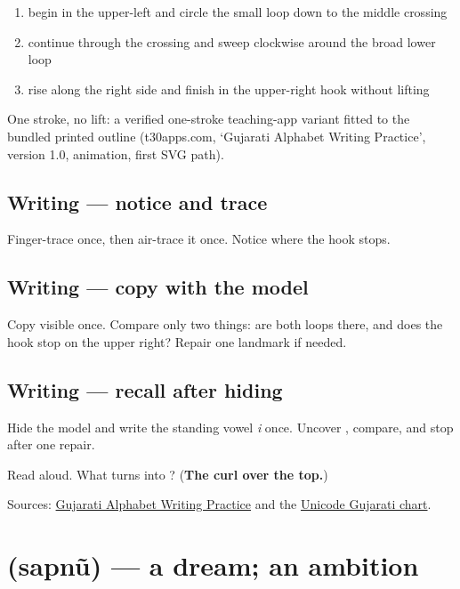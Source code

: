 \begin{enumerate}
\raggedright
  \item begin in the upper-left and circle the small loop down to the middle crossing
  \item continue through the crossing and sweep clockwise around the broad lower loop
  \item rise along the right side and finish in the upper-right hook without lifting
\end{enumerate}

One stroke, no lift: a verified one-stroke teaching-app variant fitted to the bundled printed outline (t30apps.com, ‘Gujarati Alphabet Writing Practice’, version 1.0,  animation, first SVG path).

\subsection*{Writing — notice and trace}

Finger-trace \textbf{} once, then air-trace it once. Notice where the hook stops.

\subsection*{Writing — copy with the model}
Copy visible \textbf{} once. Compare only two things: are both loops there, and does the hook stop on the upper right? Repair one landmark if needed.

\subsection*{Writing — recall after hiding}
Hide the model and write the standing vowel \emph{i} once. Uncover \textbf{}, compare, and stop after one repair.

\begin{tcolorbox}[breakable,colback=teal!4,colframe=teal!35!black,title={Before you move on}]
Read \textbf{  } aloud. What turns \textbf{} into \textbf{}? (\textbf{The curl over the top.})

Sources: \href{https://www.t30apps.com/gujarati-alphabet-writing/}{Gujarati Alphabet Writing Practice} and the \href{https://www.unicode.org/charts/PDF/U0A80.pdf}{Unicode Gujarati chart}.
\end{tcolorbox}
\section[\texorpdfstring{\gu{સપનું} (sapnũ)}{સપનું (sapnũ)}]{ (sapnũ) — a dream; an ambition}

